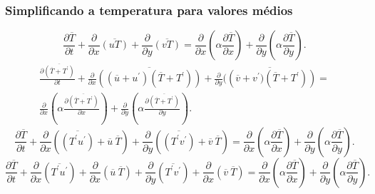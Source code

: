 \documentclass[xcolor=dvipsnames,10pt,aspectratio=169]{beamer}
\begin{document}
		
		\begin{frame}
		\frametitle{Simplificando a temperatura para valores médios}
		\begin{equation}
		\frac{\partial \overline{T}}{\partial t} + {\frac{\partial{}}{\partial{x}} \overline{(u T)}} + 
		{\frac{\partial{}}{\partial{y}} \overline{(v T)}} 
		=
		{\frac{\partial{}}{\partial{x}}} \left(\alpha {\frac{\partial{\overline{T}}}{\partial{x}}} \right) +
		{\frac{\partial{}}{\partial{y}}} \left(\alpha {\frac{\partial{\overline{T}}}{\partial{y}}} \right) .
		\end{equation}
		\begin{equation}
		\begin{split}
		\frac{\partial \overline{(\overline{T} + T^\prime)}}{\partial t} +{\frac{\partial{}}{\partial{x}} \overline{\left((\overline{u} + u^\prime)  (\overline{T} + T^\prime) \right)}} + 
		{\frac{\partial{}}{\partial{y}} \overline{(\left(\overline{v} + v^\prime)  (\overline{T} + T^\prime) \right)}} 
		= \\
		{\frac{\partial{}}{\partial{x}}} \left(\alpha {\frac{\partial{\overline{(\overline{T} + T^\prime)}}}{\partial{x}}} \right) +
		{\frac{\partial{}}{\partial{y}}} \left(\alpha {\frac{\partial{\overline{(\overline{T} + T^\prime)}}}{\partial{y}}} \right) .
		\end{split}
		\end{equation}
		\begin{equation}
		\frac{\partial \overline{T}}{\partial t} +\frac{\partial{}}{\partial{x}} \left(\overline{\left({T^\prime u^\prime}\right)} + \overline{u} \ \overline{T}\right)     + 
		\frac{\partial{}}{\partial{y}} \left(\overline{\left({T^\prime v^\prime}\right)} + \overline{v} \ \overline{T}\right) 
		=
		{\frac{\partial{}}{\partial{x}}} \left(\alpha {\frac{\partial{\overline{T}}}{\partial{x}}} \right) +
		{\frac{\partial{}}{\partial{y}}} \left(\alpha {\frac{\partial{\overline{T}}}{\partial{y}}} \right) .
		\end{equation}
		\begin{equation}\label{equation_preparede}
		\frac{\partial \overline{T}}{\partial t} +\frac{\partial{}}{\partial{x}} \left(\overline{T^\prime  u^\prime}\right) + \frac{\partial{}}{\partial{x}}\left(\overline{u} \ \overline{T}\right)     + 
		\frac{\partial{}}{\partial{y}} \left(\overline{T^\prime v^\prime}\right) + \frac{\partial{}}{\partial{x}}\left(\overline{v} \ \overline{T}\right) 
		=
		{\frac{\partial{}}{\partial{x}}} \left(\alpha {\frac{\partial{\overline{T}}}{\partial{x}}} \right) +
		{\frac{\partial{}}{\partial{y}}} \left(\alpha {\frac{\partial{\overline{T}}}{\partial{y}}} \right) .
		\end{equation}
		\end{frame}
		
\end{document}
